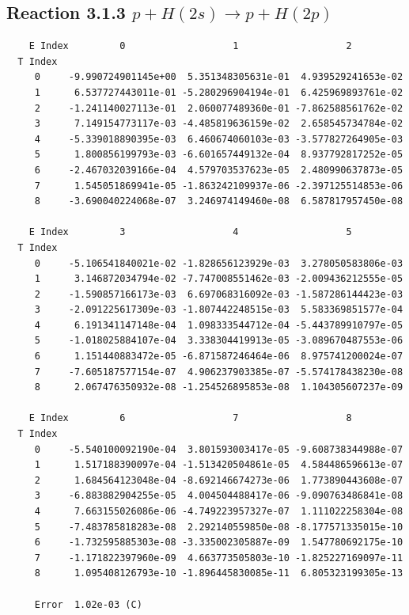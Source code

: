 \documentclass[12pt,dvipdfmx]{article}
\begin{document}
\newpage
\subsection{
Reaction 3.1.3 $   p + H(2s) \rightarrow p + H(2p)$}


\begin{small}\begin{verbatim}
    E Index         0                   1                   2
  T Index
     0     -9.990724901145e+00  5.351348305631e-01  4.939529241653e-02
     1      6.537727443011e-01 -5.280296904194e-01  6.425969893761e-02
     2     -1.241140027113e-01  2.060077489360e-01 -7.862588561762e-02
     3      7.149154773117e-03 -4.485819636159e-02  2.658545734784e-02
     4     -5.339018890395e-03  6.460674060103e-03 -3.577827264905e-03
     5      1.800856199793e-03 -6.601657449132e-04  8.937792817252e-05
     6     -2.467032039166e-04  4.579703537623e-05  2.480990637873e-05
     7      1.545051869941e-05 -1.863242109937e-06 -2.397125514853e-06
     8     -3.690040224068e-07  3.246974149460e-08  6.587817957450e-08

    E Index         3                   4                   5
  T Index
     0     -5.106541840021e-02 -1.828656123929e-03  3.278050583806e-03
     1      3.146872034794e-02 -7.747008551462e-03 -2.009436212555e-05
     2     -1.590857166173e-03  6.697068316092e-03 -1.587286144423e-03
     3     -2.091225617309e-03 -1.807442248515e-03  5.583369851577e-04
     4      6.191341147148e-04  1.098333544712e-04 -5.443789910797e-05
     5     -1.018025884107e-04  3.338304419913e-05 -3.089670487553e-06
     6      1.151440883472e-05 -6.871587246464e-06  8.975741200024e-07
     7     -7.605187577154e-07  4.906237903385e-07 -5.574178438230e-08
     8      2.067476350932e-08 -1.254526895853e-08  1.104305607237e-09

    E Index         6                   7                   8
  T Index
     0     -5.540100092190e-04  3.801593003417e-05 -9.608738344988e-07
     1      1.517188390097e-04 -1.513420504861e-05  4.584486596613e-07
     2      1.684564123048e-04 -8.692146674273e-06  1.773890443608e-07
     3     -6.883882904255e-05  4.004504488417e-06 -9.090763486841e-08
     4      7.663155026086e-06 -4.749223957327e-07  1.111022258304e-08
     5     -7.483785818283e-08  2.292140559850e-08 -8.177571335015e-10
     6     -1.732595885303e-08 -3.335002305887e-09  1.547780692175e-10
     7     -1.171822397960e-09  4.663773505803e-10 -1.825227169097e-11
     8      1.095408126793e-10 -1.896445830085e-11  6.805323199305e-13

     Error  1.02e-03 (C)
\end{verbatim}\end{small}
\end{document}
